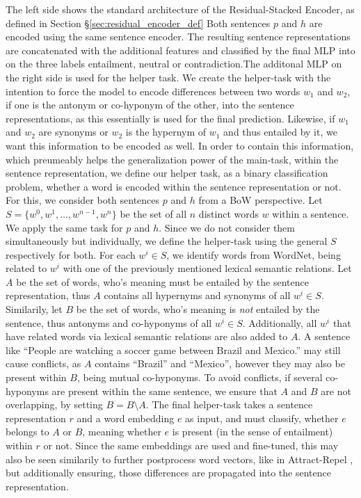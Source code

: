 The left side shows the standard architecture of the Residual-Stacked Encoder, as defined in Section §\ref{sec:residual_encoder_def} Both sentences $p$ and $h$ are encoded using the same sentence encoder. The resulting sentence representations are concatenated with the additional features and classified by the final \ac{MLP} into on the three labels entailment, neutral or contradiction.The additonal \ac{MLP} on the right side is used for the helper task. We create the helper-task with the intention to force the model to encode differences between two words $w_1$ and $w_2$, if one is the antonym or co-hyponym of the other, into the sentence representations, as this essentially is used for the final prediction.  Likewise, if $w_1$ and $w_2$ are synonyms or $w_2$ is the hypernym of $w_1$ and thus entailed by it, we want this information to be encoded as well. In order to contain this information, which preumeably helps the generalization power of the main-task, within the sentence representation, we define our helper task, as a binary classification problem, whether a word is encoded within the sentence representation or not. For this, we consider both sentences $p$ and $h$ from a \ac{BoW} perspective. Let $S=\{w^0, w^1 , \ldots, w^{n-1}, w^n\}$ be the set of all $n$ distinct words $w$ within a sentence. We apply the same task for $p$ and $h$. Since we do not consider them simultaneously but individually, we define the helper-task using the general $S$ respectively for both. For each $w^i \in S$, we identify words from WordNet, being related to $w^i$ with one of the previously mentioned lexical semantic relations. Let $A$ be the set of words, who's meaning must be entailed by the sentence representation, thus $A$ contains all hypernyms and synonyms of all $w^i \in S$. Similarily, let $B$ be the set of words, who's meaning is \textit{not} entailed by the sentence, thus antonyms and co-hyponyms of all $w^i \in S$. Additionally, all $w^i$ that have related words via lexical semantic relations are also added to $A$. A sentence like ``People are watching a soccer game between Brazil and Mexico.'' may still cause conflicts, as $A$ contains ``Brazil'' and ``Mexico'', however they may also be present within $B$, being mutual co-hyponyms. To avoid conflicts, if several co-hyponyms are present within the same sentence, we ensure that $A$ and $B$ are not overlapping, by setting $B = B \setminus A$. The final helper-task takes a sentence representation $r$ and a word embedding $e$ as input, and must classify, whether $e$ belongs to $A$ or $B$, meaning whether $e$ is present (in the sense of entailment) within $r$ or not. Since the same embeddings are used and fine-tuned, this may also be seen similarily to further postprocess word vectors, like in Attract-Repel \citep{vulic2017specialising}, but additionally ensuring, those differences are propagated into the sentence representation. 

